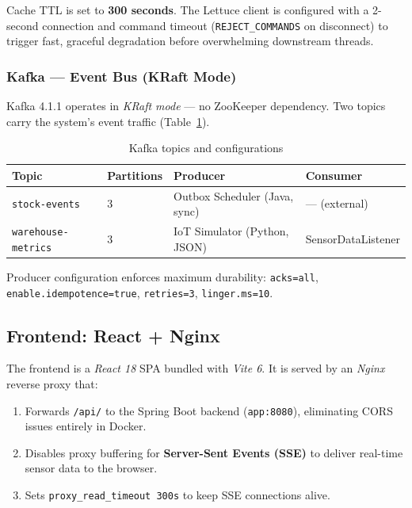 \documentclass[12pt,a4paper,twoside]{article}
\newcommand{\tech}[1]{\textit{#1}}
\begin{document}
Cache TTL is set to \textbf{300 seconds}. The Lettuce client is configured
with a 2-second connection and command timeout (\texttt{REJECT\_COMMANDS} on disconnect)
to trigger fast, graceful degradation before overwhelming downstream threads.

\subsubsection{Kafka — Event Bus (KRaft Mode)}

Kafka 4.1.1 operates in \emph{KRaft mode} — no ZooKeeper dependency.
Two topics carry the system's event traffic (Table~\ref{tab:topics}).

\begin{table}[H]
\centering
\caption{Kafka topics and configurations}
\label{tab:topics}
\begin{tabularx}{\textwidth}{@{}llXl@{}}
\toprule
\textbf{Topic}         & \textbf{Partitions} & \textbf{Producer} & \textbf{Consumer} \\
\midrule
\texttt{stock-events}      & 3 & Outbox Scheduler (Java, sync) & --- (external) \\
\texttt{warehouse-metrics} & 3 & IoT Simulator (Python, JSON)  & SensorDataListener \\
\bottomrule
\end{tabularx}
\end{table}

Producer configuration enforces maximum durability:
\texttt{acks=all}, \texttt{enable.idempotence=true},
\texttt{retries=3}, \texttt{linger.ms=10}.

\subsection{Frontend: React + Nginx}

The frontend is a \tech{React 18} SPA bundled with \tech{Vite 6}.
It is served by an \tech{Nginx} reverse proxy that:
\begin{enumerate}[noitemsep]
  \item Forwards \texttt{/api/} to the Spring Boot backend (\texttt{app:8080}),
        eliminating CORS issues entirely in Docker.
  \item Disables proxy buffering for \textbf{Server-Sent Events (SSE)}
        to deliver real-time sensor data to the browser.
  \item Sets \texttt{proxy\_read\_timeout 300s} to keep SSE connections alive.
\end{enumerate}
\end{document}
